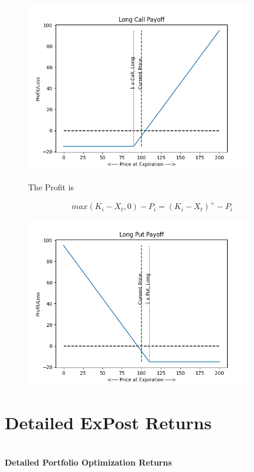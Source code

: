 \begin{appendix}
\begin{figure}[!htb]
\begin{minipage}{0.4\linewidth}
    \end{minipage}
    \begin{minipage}{0.65\linewidth}
        \centering
        \includegraphics[width=10cm]{Graphs/LongCallEx.png}
        \caption{}
        \label{fig:LC}
    \end{minipage}
\end{figure}

\begin{figure}[!h]
    \begin{minipage}{0.4\linewidth}

        The Profit is

        \[max(K_{i} - X_{t}, 0) - P_{i} = (K_{i} - X_{t})^{+} - P_{i}\]

    \end{minipage}
    \begin{minipage}{0.65\linewidth}
        \centering
        \includegraphics[width=10cm]{Graphs/LongPutEx.png}
        \caption{}
        \label{fig:LP}
    \end{minipage}
\end{figure}
\clearpage
\section{Detailed ExPost Returns}\label{app:Detail}
\begin{table}[!htbp]
\captionsetup{skip=5pt}
\begin{center}
	\caption{\\ \textbf{Detailed Portfolio Optimization Returns}}
    \scalebox{0.75}{}
    \label{tab:Output4}
\end{center}
\end{table}


\end{appendix}
